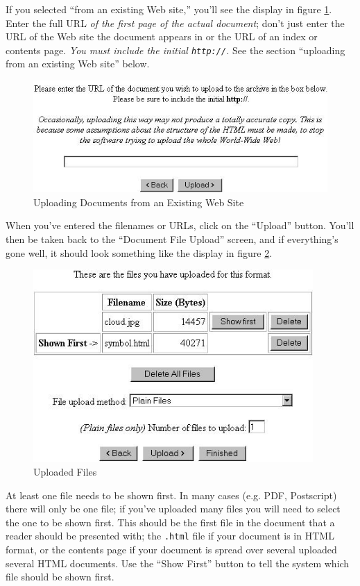 If you selected ``from an existing Web site,'' you'll see the display in figure \ref{upload_web}. Enter the full URL \emph{of the first page of the actual document}; don't just enter the URL of the Web site the document appears in or the URL of an index or contents page. \emph{You must include the initial {\tt http://}.} See the section ``uploading from an existing Web site'' below.

\begin{figure}
\centerline{\includegraphics[width=4.8in]{images/upload-web}}
\caption{\label{upload_web} Uploading Documents from an Existing Web Site}
\end{figure}

When you've entered the filenames or URLs, click on the ``Upload'' button. You'll then be taken back to the ``Document File Upload'' screen, and if everything's gone well, it should look something like the display in figure \ref{uploaded_files}.

\begin{figure}
\centerline{\includegraphics[width=4.2in]{images/uploaded-files}}
\caption{\label{uploaded_files} Uploaded Files}
\end{figure}

At least one file needs to be shown first. In many cases (e.g. PDF, Postscript) there will only be one file; if you've uploaded many files you will need to select the one to be shown first. This should be the first file in the document that a reader should be presented with; the {\tt .html} file if your document is in HTML format, or the contents page if your document is spread over several uploaded several HTML documents. Use the ``Show First'' button to tell the system which file should be shown first.

